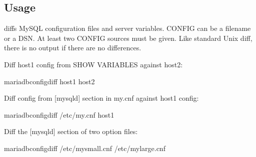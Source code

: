 \documentclass[letterpaper,10pt,english]{sphinxmanual}
\begin{document}
\subsection{Usage}
\label{\detokenize{mariadb-config-diff:usage}}
\begin{sphinxVerbatim}[commandchars=\\\{\}]
 \PYG{p}{[}\PYG{p}{]}   \PYG{p}{[}\PYG{p}{]}
\end{sphinxVerbatim}

\sphinxAtStartPar
{} diffs MySQL configuration files and server variables.
CONFIG can be a filename or a DSN.  At least two CONFIG sources must be given.
Like standard Unix diff, there is no output if there are no differences.

\sphinxAtStartPar
Diff host1 config from SHOW VARIABLES against host2:

\begin{sphinxVerbatim}[commandchars=\\\{\}]
mariadb\PYGZhy{}config\PYGZhy{}diff host1 host2
\end{sphinxVerbatim}

\sphinxAtStartPar
Diff config from {[}mysqld{]} section in my.cnf against host1 config:

\begin{sphinxVerbatim}[commandchars=\\\{\}]
mariadb\PYGZhy{}config\PYGZhy{}diff /etc/my.cnf host1
\end{sphinxVerbatim}

\sphinxAtStartPar
Diff the {[}mysqld{]} section of two option files:

\begin{sphinxVerbatim}[commandchars=\\\{\}]
mariadb\PYGZhy{}config\PYGZhy{}diff /etc/my\PYGZhy{}small.cnf /etc/my\PYGZhy{}large.cnf
\end{sphinxVerbatim}
\end{document}
